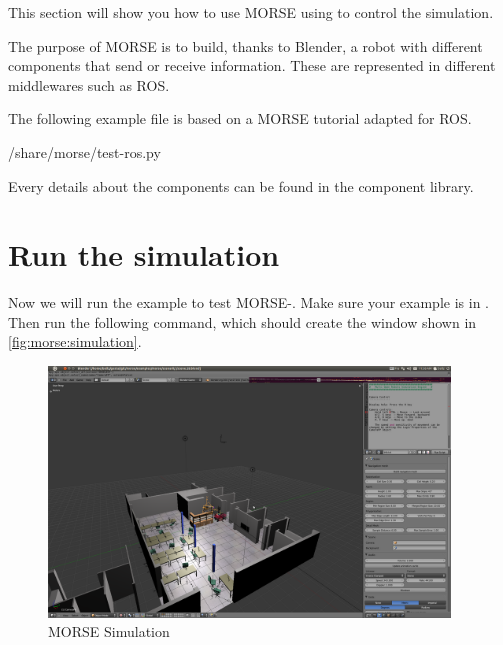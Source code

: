 This section will show you how to use MORSE using \urbi to
control the simulation.

The purpose of MORSE is to build, thanks to Blender, a robot with different
components that send or receive information. These are represented in
different middlewares such as ROS.

The following example file  is based on a
 {MORSE
  tutorial adapted for ROS}.

{\verbatimPre%

  {\absTopSrcdir/share/morse/test-ros.py}%
\verbatimPost}

Every details about the components can be found in the
{component library}.

\section{Run the simulation}

Now we will run the example to test MORSE-\urbi.  Make sure your example is
in .  Then run the following
command, which should create the window shown in
\autoref{fig:morse:simulation}.


\begin{figure}[htp]
  \centering
  \includegraphics[width=0.95\textwidth]{img/morse/simulation.png}
  \caption{MORSE Simulation}
  \label{fig:morse:simulation}
\end{figure}

